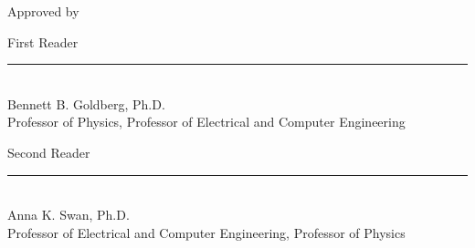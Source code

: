 \begin{titlepage}

\begin{center}
Approved by
\end{center}

\vspace{1.5in}
\baselineskip=13pt

\noindent
First Reader\ \ \ \ \  \ \rule{4.7in}{.005in}\\
\hspace*{1.15in}Bennett B. Goldberg, Ph.D.\\
\hspace*{1.15in}Professor of Physics, Professor of Electrical and Computer Engineering\\
\vspace{0.75in}

\noindent
Second Reader\ \ \ \rule{4.7in}{.005in}\\
\hspace*{1.15in}Anna K. Swan, Ph.D.\\
\hspace*{1.15in}Professor of Electrical and Computer Engineering, Professor of Physics\\
\vspace{0.75in}

\end{titlepage}


